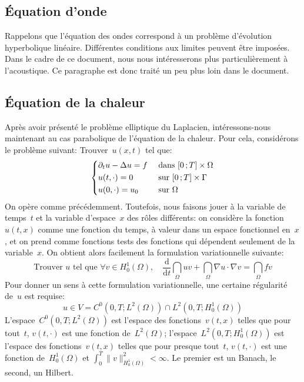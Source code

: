 \medskip
\subsection{Équation d'onde}
Rappelons que l'équation des ondes correspond à un problème d'évolution hyperbolique linéaire. Différentes conditions aux limites peuvent être imposées. Dans le cadre de ce document, nous nous intéresserons plus particulièrement à l'acoustique. Ce paragraphe est donc traité un peu plus loin dans le document.

\medskip
\subsection{Équation de la chaleur}
Après avoir présenté le problème elliptique du Laplacien, intéressons-nous maintenant au cas parabolique de l'équation de la chaleur. Pour cela, considérons le problème suivant:
Trouver~$u(x,t)$ tel que:
\begin{equation}
\left\{
\begin{aligned}
&\partial_t u -\Delta u = f &&\text{ dans } \mathopen{[}0\,;T\mathclose{]}\times\Omega\\
&u(t,\cdot) = 0 &&\text{ sur } \mathopen{[}0\,;T\mathclose{]}\times\Gamma\\
&u(0,\cdot)=u_0 &&\text{ sur } \Omega
\end{aligned}
\right.
\end{equation}
\medskip
On opère comme précédemment. Toutefois, nous faisons jouer à la variable de temps~$t$ et la variable d'espace~$x$ des rôles différents: on considère la fonction~$u(t, x)$ comme une fonction du temps, à valeur dans un espace fonctionnel en~$x$, et on prend comme fonctions tests des fonctions qui dépendent seulement de la variable~$x$. On obtient alors facilement la formulation variationnelle suivante:
\begin{equation}
\text{Trouver } u \text{ tel que } \forall v\in H^1_0(\Omega),\quad
\dfrac{\mathrm d}{\mathrm dt}\dint_\Omega uv+\dint_\Omega \nabla u\cdot\nabla v=\dint_\Omega fv
\end{equation}
Pour donner un sens à cette formulation variationnelle, une certaine régularité de~$u$ est requise:
\begin{equation}
u\in V = C^0\left(0,T;L^2(\Omega)\right)\cap L^2\left(0,T;H^1_0(\Omega)\right)
\end{equation}
L'espace~$C^0\left(0,T;L^2(\Omega)\right)$ est l'espace des fonctions~$v(t,x)$ telles
que pour tout~$t$, $v(t,\cdot)$ est une fonction de~$L^2(\Omega)$;
l'espace~$L^2\left(0,T;H^1_0(\Omega)\right)$ est l'espace des fonctions~$v(t,x)$ telles
que pour presque tout~$t$, $v(t,\cdot)$ est une fonction de~$H^1_0(\Omega)$ et
$\int_0^T \|v\|^2_{H^1_0(\Omega)}<\infty$. Le premier est un Banach, le second, un Hilbert.

